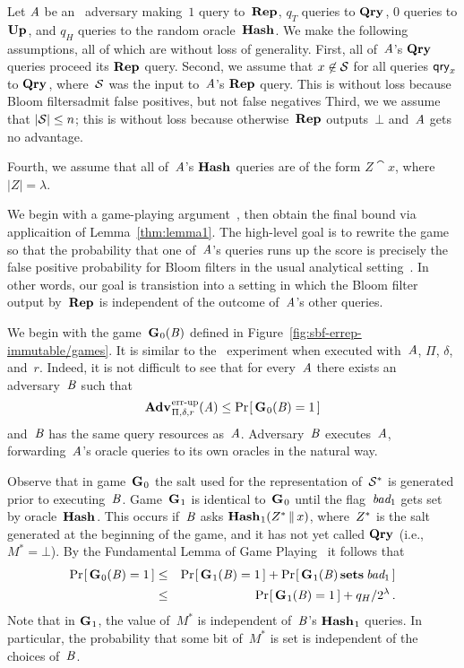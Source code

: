 Let $\mathit{A}$ be an \errep\ adversary making~$1$ query to~$\textup{\textbf{Rep}}\hspace{0.5pt}$, $q_T$ queries
to $\textup{\textbf{Qry}}\hspace{0.5pt}$, $0$ queries to $\textup{\textbf{Up}}\hspace{0.5pt}$, and $q_H$ queries to the random
oracle~$\textup{\textbf{Hash}}\hspace{0.5pt}$.
%
We make the following assumptions, all of which are without loss of generality.
%
First, all of~$\mathit{A}$'s $\textup{\textbf{Qry}}\hspace{0.5pt}$ queries proceed its $\textup{\textbf{Rep}}\hspace{0.5pt}$ query.
%
Second, we assume that $x\not\in\mathcal{S}$ for all queries $\mathsf{qry}_x$ to $\textup{\textbf{Qry}}\hspace{0.5pt}$,
where~$\mathcal{S}$ was the input to~$\mathit{A}$'s $\textup{\textbf{Rep}}\hspace{0.5pt}$ query. This is without loss
because Bloom filtersadmit false positives, but not false negatives
%
Third, we we assume that $|\mathcal{S}| \leq n$; this is without loss because
otherwise~$\textup{\textbf{Rep}}\hspace{0.5pt}$ outputs~$\bot$ and~$\mathit{A}$ gets no advantage.

Fourth, we assume that all of~$\mathit{A}$'s $\textup{\textbf{Hash}}\hspace{0.5pt}$ queries are of the form $Z\cat
x$, where $|Z| = \lambda$.

We begin with a game-playing argument~\cite{bellare2006triple}, then obtain the
final bound via applicaition of Lemma~\ref{thm:lemma1}.
%
%
The high-level goal is to rewrite the game so that the probability that one
of~$\mathit{A}$'s queries runs up the score is precisely the false positive
probability for Bloom filters in the usual analytical
setting~\cite{kirsch2006less}. In other words, our goal is transistion into a
setting in which the Bloom filter output by~$\textup{\textbf{Rep}}\hspace{0.5pt}$ is independent of the
outcome of~$\mathit{A}$'s other queries.

We begin with the game~$\textup{\textbf{G}}\hspace{0.5pt}_0(\mathit{B})$ defined in
Figure~\ref{fig:sbf-errep-immutable/games}. It is similar to the \errep\ experiment when
executed with~$\mathit{A}$, $\Pi$, $\delta$, and~$r$. Indeed, it is not difficult to
see that for every~$\mathit{A}$ there exists an adversary~$\mathit{B}$ such that
\begin{equation}
  \Adv{\errep}_{\Pi,\delta,r}(\advA) \leq \Prob{\game_0(\advB) = 1}
\end{equation}
and~$\mathit{B}$ has the same query resources as~$\mathit{A}$.
%
Adversary~$\mathit{B}$ executes~$\mathit{A}$, forwarding~$\mathit{A}$'s oracle queries
to its own oracles in the natural way.

Observe that in game~$\textup{\textbf{G}}\hspace{0.5pt}_0$ the salt used for the representation of~$\mathcal{S}^*$
is generated prior to executing~$\mathit{B}$. Game~$\textup{\textbf{G}}\hspace{0.5pt}_1$ is identical
to~$\textup{\textbf{G}}\hspace{0.5pt}_0$ until the flag~$\textit{bad}_1$ gets set by oracle~$\textup{\textbf{Hash}}\hspace{0.5pt}$. This occurs
if~$\mathit{B}$ asks $\textup{\textbf{Hash}}\hspace{0.5pt}_1(Z^* \, \| \, x)$, where~$Z^*$ is the salt generated
at the beginning of the game, and it has not yet called $\textup{\textbf{Qry}}\hspace{0.5pt}$ (i.e.,
$M^*=\bot$).
%
By the Fundamental Lemma of Game Playing~\cite{bellare2006triple} it follows
that
%
\begin{eqnarray}
  \Pr\hspace{-1pt}\left[\,\textup{\textbf{G}}\hspace{0.5pt}_0(\mathit{B})=1\,\right] &\leq&
    \Pr\hspace{-1pt}\left[\,\textup{\textbf{G}}\hspace{0.5pt}_1(\mathit{B})=1\,\right] + \Pr\hspace{-1pt}\left[\,\textup{\textbf{G}}\hspace{0.5pt}_1(\mathit{B}) \,\textup{\textbf{sets}}\hspace{0.5pt}\, \textit{bad}_1\,\right]\\
  &\leq&
    \Pr\hspace{-1pt}\left[\,\textup{\textbf{G}}\hspace{0.5pt}_1(\mathit{B})=1\,\right] + q_H/2^\lambda \,.
\end{eqnarray}
%
Note that in $\textup{\textbf{G}}\hspace{0.5pt}_1$, the value of~$M^*$ is independent of~$\mathit{B}$'s
$\textup{\textbf{Hash}}\hspace{0.5pt}_1$ queries. In particular, the probability that some bit of~$M^*$ is set
is independent of the choices of~$\mathit{B}$.

